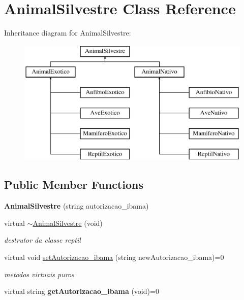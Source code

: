 \hypertarget{class_animal_silvestre}{}\section{Animal\+Silvestre Class Reference}
\label{class_animal_silvestre}
Inheritance diagram for Animal\+Silvestre\+:\begin{figure}[H]
\begin{center}
\leavevmode
\includegraphics[height=6.000000cm]{class_animal_silvestre}
\end{center}
\end{figure}
\subsection*{Public Member Functions}
\begin{DoxyCompactItemize}
\item 
\mbox{\label{class_animal_silvestre_abe4b7b04582470e089e4d926f4373df4}} 
{\bfseries Animal\+Silvestre} (string autorizacao\+\_\+ibama)
\item 
\mbox{\label{class_animal_silvestre_a33f1bc8ccaf674981f4e0a8b41c95fd7}} 
virtual \mbox{\hyperlink{class_animal_silvestre_a33f1bc8ccaf674981f4e0a8b41c95fd7}{$\sim$\+Animal\+Silvestre}} (void)
\begin{DoxyCompactList}\small\item\em destrutor da classe reptil \end{DoxyCompactList}\item 
\mbox{\label{class_animal_silvestre_a838accfdb682d7b39f3347c00a25d439}} 
virtual void \mbox{\hyperlink{class_animal_silvestre_a838accfdb682d7b39f3347c00a25d439}{set\+Autorizacao\+\_\+ibama}} (string new\+Autorizacao\+\_\+ibama)=0
\begin{DoxyCompactList}\small\item\em metodos virtuais puros \end{DoxyCompactList}\item 
\mbox{\label{class_animal_silvestre_ac0721dbe6185ad51723dbe18d753deab}} 
virtual string {\bfseries get\+Autorizacao\+\_\+ibama} (void)=0
\end{DoxyCompactItemize}

